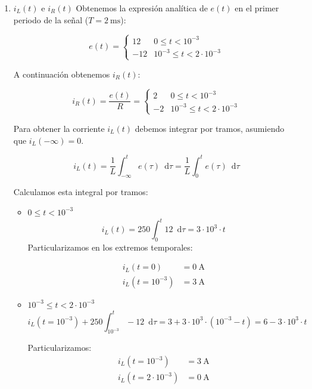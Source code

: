 \documentclass[10pt]{article}
\begin{document}
\begin{enumerate}
\item $i_L(t)$ e $i_R(t)$
  Obtenemos la expresión analítica de $e(t)$ en el primer periodo de la señal ($T = \SI{2}{\milli\second}$):
  
  \[
    e(t) = %
    \begin{cases}
      12 & 0 \leq t < 10^{-3} \\
      -12 & 10^{-3} \leq t < 2 \cdot 10^{-3}
    \end{cases}
  \]

  A continuación obtenemos $i_R(t)$:

  \[
    i_R(t) = \frac{e(t)}{R} = %
    \begin{cases}
      2 & 0 \leq t < 10^{-3} \\
      -2 & 10^{-3} \leq t < 2 \cdot 10^{-3}
    \end{cases}
  \]

  Para obtener la corriente $i_L(t)$ debemos integrar por tramos, asumiendo que $i_L(-\infty) = 0$.

  \[
    i_L(t) = \frac{1}{L} \int_{-\infty}^t e(\tau) \enspace \mathrm{d}\tau = \frac{1}{L} \int_0^t e(\tau) \enspace \mathrm{d}\tau
  \]

  Calculamos esta integral por tramos:

  \begin{itemize}
  \item   $ 0 \leq t < 10^{-3}$
    \[
      i_L(t) = 250 \int_0^t 12 \enspace \mathrm{d}\tau = 3\cdot 10^3 \cdot t
    \]
    Particularizamos en los extremos temporales:
    
    \begin{align*}
      i_L(t = 0) &= \SI{0}{\ampere}\\
      i_L(t = 10^{-3}) &= \SI{3}{\ampere}
    \end{align*}
    
  \item $10^{-3} \leq t < 2 \cdot 10^{-3}$
    \[
      i_L(t = 10^{-3}) + 250 \int_{10^{-3}}^t -12 \enspace \mathrm{d}\tau = 3 + 3\cdot 10^3 \cdot (10^{-3} - t) = 6- 3 \cdot 10^3 \cdot t
    \]

    Particularizamos:
    \begin{align*}
      i_L(t = 10^{-3}) &= \SI{3}{\ampere}\\
      i_L(t = 2 \cdot 10^{-3}) &= \SI{0}{\ampere}
    \end{align*}

  \end{itemize}


\end{enumerate}
\end{document}
